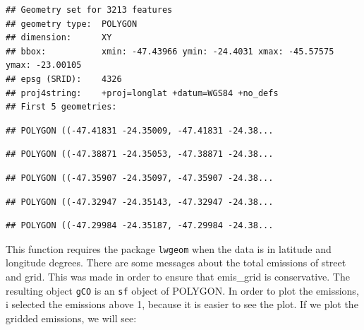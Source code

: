\documentclass[12pt,graybox,envcountchap,sectrefs]{krantz}
\makeatletter
\newenvironment{Shaded}{\begin{snugshade}}{\end{snugshade}}
\newcommand{\KeywordTok}[1]{\textcolor[rgb]{0.13,0.29,0.53}{\textbf{#1}}}
\newcommand{\DataTypeTok}[1]{\textcolor[rgb]{0.13,0.29,0.53}{#1}}
\newcommand{\DecValTok}[1]{\textcolor[rgb]{0.00,0.00,0.81}{#1}}
\newcommand{\StringTok}[1]{\textcolor[rgb]{0.31,0.60,0.02}{#1}}
\newcommand{\OtherTok}[1]{\textcolor[rgb]{0.56,0.35,0.01}{#1}}
\newcommand{\OperatorTok}[1]{\textcolor[rgb]{0.81,0.36,0.00}{\textbf{#1}}}
\newcommand{\NormalTok}[1]{#1}
\newenvironment{kframe}{%
\medskip{}
\setlength{\fboxsep}{.8em}
 \def\at@end@of@kframe{}%
 \ifinner\ifhmode%
  \def\at@end@of@kframe{\end{minipage}}%
  \begin{minipage}{\columnwidth}%
 \fi\fi%
 \def\FrameCommand##1{\hskip\@totalleftmargin \hskip-\fboxsep
 \colorbox{shadecolor}{##1}\hskip-\fboxsep
     \hskip-\linewidth \hskip-\@totalleftmargin \hskip\columnwidth}%
 \MakeFramed {\advance\hsize-\width
   \@totalleftmargin\z@ \linewidth\hsize
   \@setminipage}}%
 {\par\unskip\endMakeFramed%
 \at@end@of@kframe}
\renewenvironment{Shaded}{\begin{kframe}}{\end{kframe}}
\theoremstyle{definition}
\theoremstyle{definition}
\theoremstyle{definition}
\theoremstyle{remark}
\makeatother
\begin{document}
\begin{Shaded}
\end{Shaded}

\begin{verbatim}
## Geometry set for 3213 features 
## geometry type:  POLYGON
## dimension:      XY
## bbox:           xmin: -47.43966 ymin: -24.4031 xmax: -45.57575 ymax: -23.00105
## epsg (SRID):    4326
## proj4string:    +proj=longlat +datum=WGS84 +no_defs
## First 5 geometries:
\end{verbatim}

\begin{verbatim}
## POLYGON ((-47.41831 -24.35009, -47.41831 -24.38...
\end{verbatim}

\begin{verbatim}
## POLYGON ((-47.38871 -24.35053, -47.38871 -24.38...
\end{verbatim}

\begin{verbatim}
## POLYGON ((-47.35907 -24.35097, -47.35907 -24.38...
\end{verbatim}

\begin{verbatim}
## POLYGON ((-47.32947 -24.35143, -47.32947 -24.38...
\end{verbatim}

\begin{verbatim}
## POLYGON ((-47.29984 -24.35187, -47.29984 -24.38...
\end{verbatim}

This function requires the package \texttt{lwgeom} when the data is in
latitude and longitude degrees. There are some messages about the total
emissions of street and grid. This was made in order to ensure that
emis\_grid is conservative. The resulting object \texttt{gCO} is an
\texttt{sf} object of POLYGON. In order to plot the emissions, i
selected the emissions above 1, because it is easier to see the plot. If
we plot the gridded emissions, we will see:

\begin{Shaded}
\end{Shaded}
\end{document}
